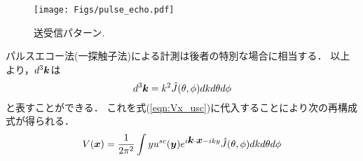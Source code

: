 \begin{figure}[h]
	\begin{center}
	\texttt{[image: Figs/pulse\_echo.pdf]} 
	\end{center}
	\caption{送受信パターン.} 
	\label{fig:}
\end{figure}
パルスエコー法(一探触子法)による計測は後者の特別な場合に相当する．
以上より，$d^3\mbox{\boldmath $k$}$は
\begin{equation}
	d^3\mbox{\boldmath $k$}=k^2\hat{J}(\theta,\phi) dkd\theta d\phi
	\label{eqn:}
\end{equation}
と表すことができる．
これを式(\ref{eqn:Vx_usc})に代入することにより次の再構成式が得られる．
\begin{equation}
	V(\mbox{\boldmath $x$}) =\frac{1}{2\pi^2} \int yu^{sc}(\mbox{\boldmath $y$})
	e^{i\mbox{\boldmath $k$}\cdot \mbox{\boldmath $x$}-iky}
	\hat{J}(\theta,\phi) dkd\theta d\phi
	\label{eqn:}
\end{equation}


